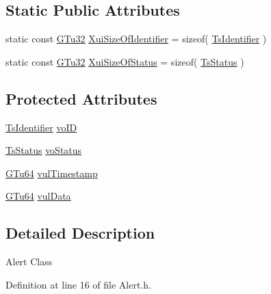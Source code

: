 \subsection*{Static Public Attributes}
\begin{DoxyCompactItemize}
\item 
static const \mbox{\hyperlink{namespace_g_n_common_ae5485474bc8f23e462e920a17b377b53}{G\+Tu32}} \mbox{\hyperlink{class_g_n_common_1_1_g_tc_alert_a17e549148a2f549495b0e8567f546e81}{Xui\+Size\+Of\+Identifier}} = sizeof( \mbox{\hyperlink{struct_g_n_common_1_1_g_tc_alert_1_1_ts_identifier}{Ts\+Identifier}} )
\item 
static const \mbox{\hyperlink{namespace_g_n_common_ae5485474bc8f23e462e920a17b377b53}{G\+Tu32}} \mbox{\hyperlink{class_g_n_common_1_1_g_tc_alert_a8d30391ac04c117ef5e25b9a0fa693e5}{Xui\+Size\+Of\+Status}} = sizeof( \mbox{\hyperlink{struct_g_n_common_1_1_g_tc_alert_1_1_ts_status}{Ts\+Status}} )
\end{DoxyCompactItemize}
\subsection*{Protected Attributes}
\begin{DoxyCompactItemize}
\item 
\mbox{\hyperlink{struct_g_n_common_1_1_g_tc_alert_1_1_ts_identifier}{Ts\+Identifier}} \mbox{\hyperlink{class_g_n_common_1_1_g_tc_alert_a1a54c1bf2758812609e876b9eec75df5}{vo\+ID}}
\item 
\mbox{\hyperlink{struct_g_n_common_1_1_g_tc_alert_1_1_ts_status}{Ts\+Status}} \mbox{\hyperlink{class_g_n_common_1_1_g_tc_alert_a88ffecd8070f3a63f4cd4f677adc43b1}{vo\+Status}}
\item 
\mbox{\hyperlink{namespace_g_n_common_a01e8527dabf7ab4f123156b0701945eb}{G\+Tu64}} \mbox{\hyperlink{class_g_n_common_1_1_g_tc_alert_acc753824948e4d169e7af7083ced87a0}{vul\+Timestamp}}
\item 
\mbox{\hyperlink{namespace_g_n_common_a01e8527dabf7ab4f123156b0701945eb}{G\+Tu64}} \mbox{\hyperlink{class_g_n_common_1_1_g_tc_alert_a125041e4424d1f43c332e980a5f2aaa2}{vul\+Data}}
\end{DoxyCompactItemize}


\subsection{Detailed Description}
Alert Class 

Definition at line 16 of file Alert.\+h.



